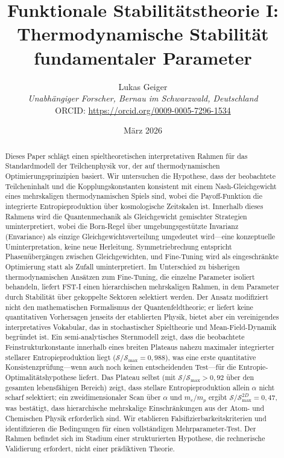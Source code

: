 \documentclass[12pt,a4paper]{article}
\title{Funktionale Stabilit\"atstheorie I: Thermodynamische Stabilit\"at fundamentaler Parameter}
\author{Lukas Geiger\\
\textit{Unabh\"angiger Forscher, Bernau im Schwarzwald, Deutschland}\\
ORCID: \url{https://orcid.org/0009-0005-7296-1534}}
\date{M\"arz 2026}
\theoremstyle{remark}
\begin{document}
\maketitle

\begin{abstract}
Dieses Paper schl\"agt einen spieltheoretischen interpretativen Rahmen f\"ur das Standardmodell der Teilchenphysik vor, der auf thermodynamischen Optimierungsprinzipien basiert. Wir untersuchen die Hypothese, dass der beobachtete Teilcheninhalt und die Kopplungskonstanten konsistent mit einem Nash-Gleichgewicht eines mehrskaligen thermodynamischen Spiels sind, wobei die Payoff-Funktion die integrierte Entropieproduktion \"uber kosmologische Zeitskalen ist. Innerhalb dieses Rahmens wird die Quantenmechanik als Gleichgewicht gemischter Strategien uminterpretiert, wobei die Born-Regel \"uber umgebungsgest\"utzte Invarianz (Envariance) als einzige Gleichgewichtsverteilung umgedeutet wird---eine konzeptuelle Uminterpretation, keine neue Herleitung. Symmetriebrechung entspricht Phasen\"uberg\"angen zwischen Gleichgewichten, und Fine-Tuning wird als eingeschr\"ankte Optimierung statt als Zufall uminterpretiert. Im Unterschied zu bisherigen thermodynamischen Ans\"atzen zum Fine-Tuning, die einzelne Parameter isoliert behandeln, liefert FST-I einen hierarchischen mehrskaligen Rahmen, in dem Parameter durch Stabilit\"at \"uber gekoppelte Sektoren selektiert werden. Der Ansatz modifiziert nicht den mathematischen Formalismus der Quantenfeldtheorie; er liefert keine quantitativen Vorhersagen jenseits der etablierten Physik, bietet aber ein vereinigendes interpretatives Vokabular, das in stochastischer Spieltheorie und Mean-Field-Dynamik begr\"undet ist. Ein semi-analytisches Sternmodell zeigt, dass die beobachtete Feinstrukturkonstante innerhalb eines breiten Plateaus nahezu maximaler integrierter stellarer Entropieproduktion liegt ($\mathcal{S}/\mathcal{S}_{\max} = 0{,}988$), was eine erste quantitative Konsistenzpr\"ufung---wenn auch noch keinen entscheidenden Test---f\"ur die Entropie-Optimalit\"atshypothese liefert. Das Plateau selbst (mit $\mathcal{S}/\mathcal{S}_{\max} > 0{,}92$ \"uber den gesamten lebensfähigen Bereich) zeigt, dass stellare Entropieproduktion allein $\alpha$ nicht scharf selektiert; ein zweidimensionaler Scan \"uber $\alpha$ und $m_e/m_p$ ergibt $\mathcal{S}/\mathcal{S}_{\max}^{2D} = 0{,}47$, was best\"atigt, dass hierarchische mehrskalige Einschr\"ankungen aus der Atom- und Chemischen Physik erforderlich sind. Wir etablieren Falsifizierbarkeitskriterien und identifizieren die Bedingungen f\"ur einen vollst\"andigen Mehrparameter-Test. Der Rahmen befindet sich im Stadium einer strukturierten Hypothese, die rechnerische Validierung erfordert, nicht einer pr\"adiktiven Theorie.
\end{abstract}
\end{document}
